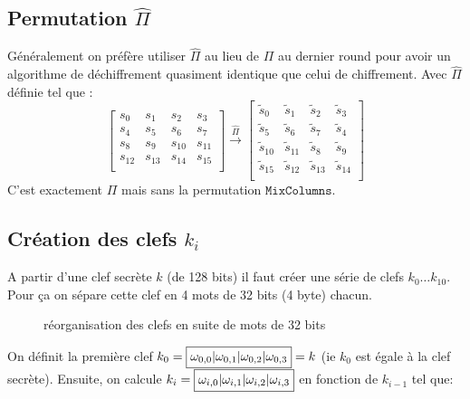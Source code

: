 \documentclass[a4paper, 12pt]{article}
\begin{document}
\subsection{Permutation $\hat{\Pi}$}
Généralement on préfère utiliser $\hat{\Pi}$ au lieu de $\Pi$  au dernier round pour avoir un algorithme de déchiffrement quasiment identique que celui de chiffrement. Avec $\hat{\Pi}$ définie tel que :
$$
\begin{bmatrix}
	s_{0} & s_{1} & s_{2} & s_{3} \\
	s_{4} & s_{5} & s_{6} & s_{7} \\
	s_{8} & s_{9} & s_{10} & s_{11} \\
	s_{12} & s_{13} & s_{14} & s_{15} \\
\end{bmatrix}
\overset{\hat{\Pi}}{\rightarrow}
\begin{bmatrix}
	\tilde{s}_0 & \tilde{s}_1 & \tilde{s}_2 & \tilde{s}_3 \\
	\tilde{s}_5 & \tilde{s}_6 & \tilde{s}_7 & \tilde{s}_4 \\
	\tilde{s}_{10} & \tilde{s}_{11} & \tilde{s}_8 & \tilde{s}_9 \\
	\tilde{s}_{15} & \tilde{s}_{12} & \tilde{s}_{13} & \tilde{s}_{14} \\
\end{bmatrix}
$$
C'est exactement $\Pi$ mais sans la permutation $\mathtt{MixColumns}$. 

\subsection{Création des clefs $k_i$}\label{clefki}
A partir d'une clef secrète $k$ (de 128 bits) il faut créer une série de clefs $k_0\dots k_{10}$.
Pour ça on sépare cette clef en 4 mots de 32 bits (4 byte) chacun.

\begin{figure}[h]
\centering
{}
\caption{réorganisation des clefs en suite de mots de 32 bits}
\label{illu_clef}
\end{figure}
On définit la première clef $k_0 = \fbox{$\omega_{0,0}|\omega_{0,1}|\omega_{0,2}|\omega_{0,3}$} = k$ (ie $k_0$ est égale à la clef secrète). Ensuite, on calcule $k_i = \fbox{$\omega_{i,0}|\omega_{i,1}|\omega_{i,2}|\omega_{i,3}$}$ en fonction de $k_{i-1}$ tel que:
\end{document}
